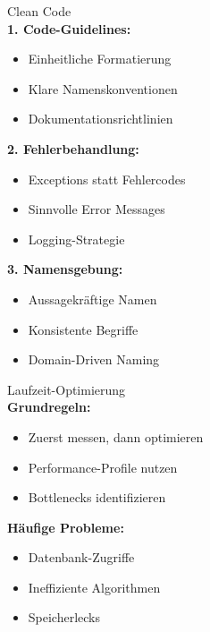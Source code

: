 \begin{KR}{Clean Code}\\
\textbf{1. Code-Guidelines:}
\begin{itemize}
    \item Einheitliche Formatierung
    \item Klare Namenskonventionen
    \item Dokumentationsrichtlinien
\end{itemize}

\textbf{2. Fehlerbehandlung:}
\begin{itemize}
    \item Exceptions statt Fehlercodes
    \item Sinnvolle Error Messages
    \item Logging-Strategie
\end{itemize}

\textbf{3. Namensgebung:}
\begin{itemize}
    \item Aussagekräftige Namen
    \item Konsistente Begriffe
    \item Domain-Driven Naming
\end{itemize}
\end{KR}

\begin{concept}{Laufzeit-Optimierung}\\
\textbf{Grundregeln:}
\begin{itemize}
    \item Zuerst messen, dann optimieren
    \item Performance-Profile nutzen
    \item Bottlenecks identifizieren
\end{itemize}

\textbf{Häufige Probleme:}
\begin{itemize}
    \item Datenbank-Zugriffe
    \item Ineffiziente Algorithmen
    \item Speicherlecks
\end{itemize}
\end{concept}

